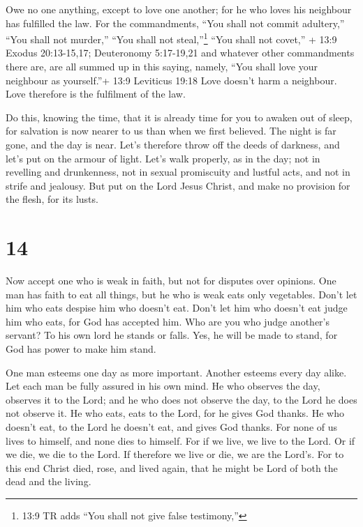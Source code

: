  Owe no one anything, except to love one another; for he who
loves his neighbour has fulfilled the law.  For the
commandments, ``You shall not commit adultery,'' ``You shall not
murder,'' ``You shall not steal,''\footnote{13:9 TR adds ``You shall not
  give false testimony,''} ``You shall not covet,'' + 13:9 Exodus
20:13-15,17; Deuteronomy 5:17-19,21 and whatever other commandments
there are, are all summed up in this saying, namely, ``You shall love
your neighbour as yourself.''+ 13:9 Leviticus 19:18  Love
doesn't harm a neighbour. Love therefore is the fulfilment of the law.

 Do this, knowing the time, that it is already time for you
to awaken out of sleep, for salvation is now nearer to us than when we
first believed.  The night is far gone, and the day is
near. Let's therefore throw off the deeds of darkness, and let's put on
the armour of light.  Let's walk properly, as in the day;
not in revelling and drunkenness, not in sexual promiscuity and lustful
acts, and not in strife and jealousy.  But put on the Lord
Jesus Christ, and make no provision for the flesh, for its lusts.

\hypertarget{section-13}{%
\section{14}\label{section-13}}

 Now accept one who is weak in faith, but not for disputes
over opinions.  One man has faith to eat all things, but he
who is weak eats only vegetables.  Don't let him who eats
despise him who doesn't eat. Don't let him who doesn't eat judge him who
eats, for God has accepted him.  Who are you who judge
another's servant? To his own lord he stands or falls. Yes, he will be
made to stand, for God has power to make him stand.

 One man esteems one day as more important. Another esteems
every day alike. Let each man be fully assured in his own mind.
 He who observes the day, observes it to the Lord; and he
who does not observe the day, to the Lord he does not observe it. He who
eats, eats to the Lord, for he gives God thanks. He who doesn't eat, to
the Lord he doesn't eat, and gives God thanks.  For none of
us lives to himself, and none dies to himself.  For if we
live, we live to the Lord. Or if we die, we die to the Lord. If
therefore we live or die, we are the Lord's.  For to this
end Christ died, rose, and lived again, that he might be Lord of both
the dead and the living.

